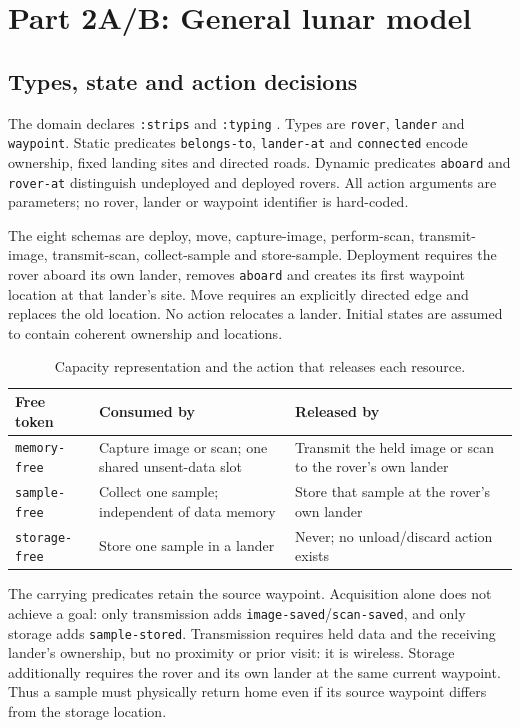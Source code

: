 \documentclass[11pt,a4paper]{article}
\begin{document}
\clearpage
\section{Part 2A/B: General lunar model}\label{part2-start}
\subsection{Types, state and action decisions}
The domain declares \texttt{:strips} and \texttt{:typing} \cite{spec}. Types are \texttt{rover}, \texttt{lander} and \texttt{waypoint}. Static predicates \texttt{belongs-to}, \texttt{lander-at} and \texttt{connected} encode ownership, fixed landing sites and directed roads. Dynamic predicates \texttt{aboard} and \texttt{rover-at} distinguish undeployed and deployed rovers. All action arguments are parameters; no rover, lander or waypoint identifier is hard-coded.

The eight schemas are deploy, move, capture-image, perform-scan, transmit-image, transmit-scan, collect-sample and store-sample. Deployment requires the rover aboard its own lander, removes \texttt{aboard} and creates its first waypoint location at that lander's site. Move requires an explicitly directed edge and replaces the old location. No action relocates a lander. Initial states are assumed to contain coherent ownership and locations.

\begin{table}[H]\centering
\caption{Capacity representation and the action that releases each resource.}
\begin{tabularx}{\linewidth}{@{}p{.21\linewidth}YY@{}}
\toprule
\textbf{Free token} & \textbf{Consumed by} & \textbf{Released by}\\
\midrule
\texttt{memory-free} & Capture image or scan; one shared unsent-data slot & Transmit the held image or scan to the rover's own lander\\
\texttt{sample-free} & Collect one sample; independent of data memory & Store that sample at the rover's own lander\\
\texttt{storage-free} & Store one sample in a lander & Never; no unload/discard action exists\\
\bottomrule
\end{tabularx}
\end{table}
The carrying predicates retain the source waypoint. Acquisition alone does not achieve a goal: only transmission adds \texttt{image-saved}/\texttt{scan-saved}, and only storage adds \texttt{sample-stored}. Transmission requires held data and the receiving lander's ownership, but no proximity or prior visit: it is wireless. Storage additionally requires the rover and its own lander at the same current waypoint. Thus a sample must physically return home even if its source waypoint differs from the storage location.
\end{document}
